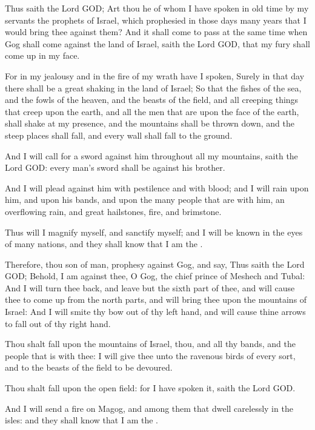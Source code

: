 \Verse Thus saith the Lord GOD; Art thou he of whom I have spoken in old time by my servants the prophets of Israel, which prophesied in those days many years that I would bring thee against them?  \Verse And it shall come to pass at the same time when Gog shall come against the land of Israel, saith the Lord GOD, that my fury shall come up in my face.

\Verse For in my jealousy and in the fire of my wrath have I spoken, Surely in that day there shall be a great shaking in the land of Israel; \Verse So that the fishes of the sea, and the fowls of the heaven, and the beasts of the field, and all creeping things that creep upon the earth, and all the men that are upon the face of the earth, shall shake at my presence, and the mountains shall be thrown down, and the steep places shall fall, and every wall shall fall to the ground.

\Verse And I will call for a sword against him throughout all my mountains, saith the Lord GOD: every man's sword shall be against his brother.

\Verse And I will plead against him with pestilence and with blood; and I will rain upon him, and upon his bands, and upon the many people that are with him, an overflowing rain, and great hailstones, fire, and brimstone.

\Verse Thus will I magnify myself, and sanctify myself; and I will be known in the eyes of many nations, and they shall know that I am the \LORD.


\Chapter
\Verse Therefore, thou son of man, prophesy against Gog, and say, Thus saith the Lord GOD; Behold, I am against thee, O Gog, the chief prince of Meshech and Tubal: \Verse And I will turn thee back, and leave but the sixth part of thee, and will cause thee to come up from the north parts, and will bring thee upon the mountains of Israel: \Verse And I will smite thy bow out of thy left hand, and will cause thine arrows to fall out of thy right hand.

\Verse Thou shalt fall upon the mountains of Israel, thou, and all thy bands, and the people that is with thee: I will give thee unto the ravenous birds of every sort, and to the beasts of the field to be devoured.

\Verse Thou shalt fall upon the open field: for I have spoken it, saith the Lord GOD.

\Verse And I will send a fire on Magog, and among them that dwell carelessly in the isles: and they shall know that I am the \LORD.

